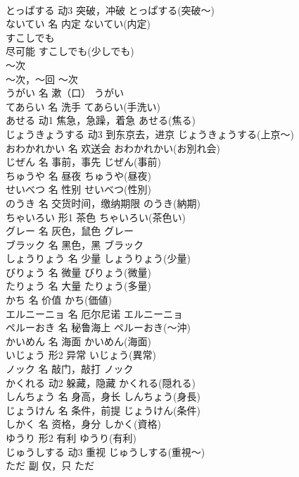 \documentclass[8pt]{extreport}
\begin{document}
\begin{CJK}{UTF8}{min}
\\	とっぱする	动3	突破，冲破	とっぱする(突破～)	
\\	ないてい	名	内定	ないてい(内定)	
\\	すこしでも	
\\	尽可能	すこしでも(少しでも)	
\\	～次	
\\	～次，～回	～次	
\\	うがい	名	漱（口）	うがい	
\\	てあらい	名	洗手	てあらい(手洗い)	
\\	あせる	动1	焦急，急躁，着急	あせる(焦る)	
\\	じょうきょうする	动3	到东京去，进京	じょうきょうする(上京～)	
\\	おわかれかい	名	欢送会	おわかれかい(お別れ会)	
\\	じぜん	名	事前，事先	じぜん(事前)	
\\	ちゅうや	名	昼夜	ちゅうや(昼夜)	
\\	せいべつ	名	性别	せいべつ(性別)	
\\	のうき	名	交货时间，缴纳期限	のうき(納期)	
\\	ちゃいろい	形1	茶色	ちゃいろい(茶色い)	
\\	グレー	名	灰色，鼠色	グレー	
\\	ブラック	名	黑色，黑	ブラック	
\\	しょうりょう	名	少量	しょうりょう(少量)	
\\	びりょう	名	微量	びりょう(微量)	
\\	たりょう	名	大量	たりょう(多量)	
\\	かち	名	价值	かち(価値)	
\\	エルニーニョ	名	厄尔尼诺	エルニーニョ	
\\	ペルーおき	名	秘鲁海上	ペルーおき(～沖)	
\\	かいめん	名	海面	かいめん(海面)	
\\	いじょう	形2	异常	いじょう(異常)	
\\	ノック	名	敲门，敲打	ノック	
\\	かくれる	动2	躲藏，隐藏	かくれる(隠れる)	
\\	しんちょう	名	身高，身长	しんちょう(身長)	
\\	じょうけん	名	条件，前提	じょうけん(条件)	
\\	しかく	名	资格，身分	しかく(資格)	
\\	ゆうり	形2	有利	ゆうり(有利)	
\\	じゅうしする	动3	重视	じゅうしする(重視～)	
\\	ただ	副	仅，只	ただ	

\end{CJK}
\end{document}
